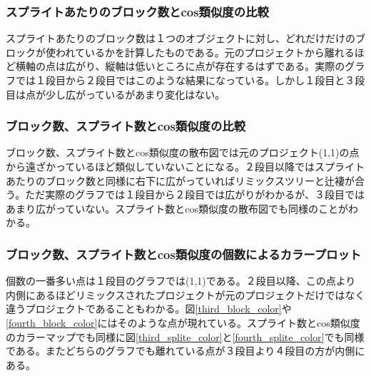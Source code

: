 \documentclass[a4paper,10pt,onecolumn,oneside,openany]{jsbook}
\begin{document}
\subsubsection{スプライトあたりのブロック数とcos類似度の比較}
スプライトあたりのブロック数は１つのオブジェクトに対し、どれだけだけのブロックが使われているかを計算したものである。元のプロジェクトから離れるほど横軸の点は広がり、縦軸は低いところに点が存在するはずである。実際のグラフでは１段目から２段目ではこのような結果になっている。しかし１段目と３段目は点が少し広がっているがあまり変化はない。

\subsubsection{ブロック数、スプライト数とcos類似度の比較}
ブロック数、スプライト数とcos類似度の散布図では元のプロジェクト(1,1)の点から遠ざかっているほど類似していないことになる。２段目以降ではスプライトあたりのブロック数と同様に右下に広がっていればリミックスツリーと辻褄が合う。ただ実際のグラフでは１段目から２段目では広がりがわかるが、３段目ではあまり広がっていない。スプライト数とcos類似度の散布図でも同様のことがわかる。

\subsubsection{ブロック数、スプライト数とcos類似度の個数によるカラープロット}
個数の一番多い点は１段目のグラフでは(1,1)である。２段目以降、この点より内側にあるほどリミックスされたプロジェクトが元のプロジェクトだけではなく違うプロジェクトであることもわかる。図\ref{third_block_color}や\ref{fourth_block_color}にはそのような点が現れている。スプライト数とcos類似度のカラーマップでも同様に図\ref{third_splite_color}と\ref{fourth_splite_color}でも同様である。またどちらのグラフでも離れている点が３段目より４段目の方が内側にある。
\end{document}
